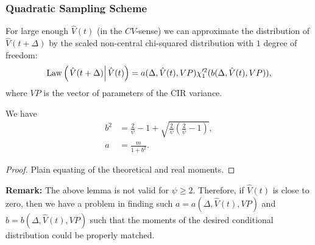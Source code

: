             \subsubsection{Quadratic Sampling Scheme}
                For large enough $\hat{V}(t)$ (in the $CV$-sense) we can approximate the distribution of $\hat{V}(t+\Delta)$ by the scaled non-central chi-squared distribution with $1$ degree of freedom:
                \begin{align}
                    \operatorname*{Law}\left(\left.\hat{V}(t+\Delta) \right| \hat V(t)\right) =  a(\Delta, \hat{V}(t), VP) \chi'^2_1(b(\Delta, \hat{V}(t), VP)),
                \end{align}
                where $VP$ is the vector of parameters of the CIR variance.
                \begin{lemma}
                    We have
                    \begin{align}
                        b^2 &= \frac{2}{\psi} -1 +\sqrt{\frac{2}{\psi}\left(\frac{2}{\psi}-1\right)}, \\ 
                        a   &= \frac{m}{1+b^2}.
                    \end{align}
                \end{lemma}
                \begin{proof}
                    {\color{red}Plain equating of the theoretical and real moments.}
                \end{proof}
                \textbf{Remark:} The above lemma is not valid for $\psi \geq 2$.
                Therefore, if $\hat{V}(t)$ is close to zero, then we have a problem in finding such $a = a(\Delta, \hat{V}(t), VP)$ and $b = b(\Delta, \hat{V}(t), VP)$ such that the moments of the desired conditional distribution could be properly matched.

